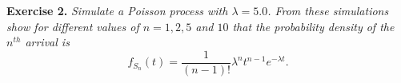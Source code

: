 
\textbf{Exercise 2. }\emph{Simulate a Poisson process with \( \lambda = 5.0 \). From these simulations show for different values of \( n = 1,2,5 \) and \( 10 \) that the probability density of the \( n^{th} \) arrival is  }
\[
  f_{S_{n}}(t) = \frac{1}{(n-1)!} \lambda^{n}t^{n-1}e^{-\lambda t}.
\]
